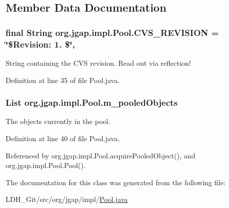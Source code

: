 \subsection{Member Data Documentation}
\hypertarget{classorg_1_1jgap_1_1impl_1_1_pool_ab7440c6f3b541e84d9c1ea60dd2c4bd6}{
\subsubsection[{C\-V\-S\-\_\-\-R\-E\-V\-I\-S\-I\-O\-N}]{\setlength{\rightskip}{0pt plus 5cm}final String org.\-jgap.\-impl.\-Pool.\-C\-V\-S\-\_\-\-R\-E\-V\-I\-S\-I\-O\-N = \char`\"{}\$Revision\-: 1. \$\char`\"{}\hspace{0.3cm}{\ttfamily [static]}, {\ttfamily [private]}}}\label{classorg_1_1jgap_1_1impl_1_1_pool_ab7440c6f3b541e84d9c1ea60dd2c4bd6}
String containing the C\-V\-S revision. Read out via reflection! 

Definition at line 35 of file Pool.\-java.

\hypertarget{classorg_1_1jgap_1_1impl_1_1_pool_ab6b1b9c3817ac388078aabcd0cf2206f}{
\subsubsection[{m\-\_\-pooled\-Objects}]{\setlength{\rightskip}{0pt plus 5cm}List org.\-jgap.\-impl.\-Pool.\-m\-\_\-pooled\-Objects\hspace{0.3cm}{\ttfamily [private]}}}\label{classorg_1_1jgap_1_1impl_1_1_pool_ab6b1b9c3817ac388078aabcd0cf2206f}
The objects currently in the pool. 

Definition at line 40 of file Pool.\-java.



Referenced by org.\-jgap.\-impl.\-Pool.\-acquire\-Pooled\-Object(), and org.\-jgap.\-impl.\-Pool.\-Pool().



The documentation for this class was generated from the following file\-:\begin{DoxyCompactItemize}
\item 
L\-D\-H\-\_\-\-Git/src/org/jgap/impl/\hyperlink{_pool_8java}{Pool.\-java}\end{DoxyCompactItemize}
